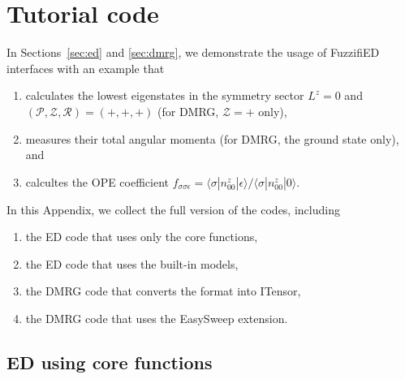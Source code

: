 \documentclass{timesjhep}
\begin{document}
\section{Tutorial code}
\label{app:code}

In Sections~\ref{sec:ed} and \ref{sec:dmrg}, we demonstrate the usage of FuzzifiED interfaces with an example that 
\begin{enumerate}
    \item calculates the lowest eigenstates in the symmetry sector $L^z=0$ and $(\mathscr{P},\mathscr{Z},\mathscr{R})=(+,+,+)$ (for DMRG, $\mathscr{Z}=+$ only),
    \item measures their total angular momenta (for DMRG, the ground state only), and 
    \item calcultes the OPE coefficient $f_{\sigma\sigma\epsilon}=\langle \sigma|n^z_{00}|\epsilon\rangle/\langle \sigma|n^z_{00}|0\rangle$.
\end{enumerate}
In this Appendix, we collect the full version of the codes, including
\begin{enumerate}
    \item the ED code that uses only the core functions, 
    \item the ED code that uses the built-in models, 
    \item the DMRG code that converts the format into ITensor, 
    \item the DMRG code that uses the EasySweep extension. 
\end{enumerate}

\subsection{ED using core functions}
\label{app:code_ed1}
\end{document}
